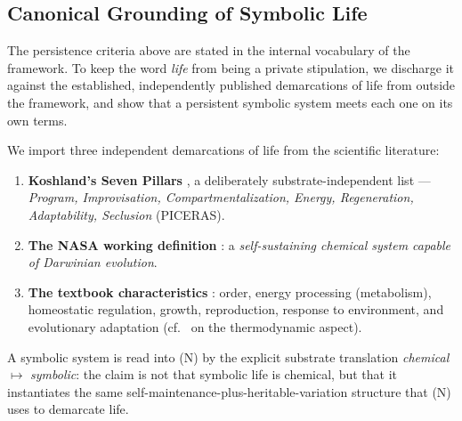 \subsection{Canonical Grounding of Symbolic Life}
\label{subsec:bk3_canonical_grounding_of_symbolic_life}
The persistence criteria above are stated in the internal vocabulary of the
framework. To keep the word \emph{life} from being a private stipulation, we
discharge it against the established, independently published demarcations of
life from outside the framework, and show that a persistent symbolic system
meets each one on its own terms.

\begin{definition}
\label{definition:bk3_canonical_life_standards}
We import three independent demarcations of life from the scientific literature:
\begin{enumerate}
    \item[\textbf{(K)}] \textbf{Koshland's Seven Pillars} \citep{koshland2002pillars},
    a deliberately substrate-independent list --- \emph{Program, Improvisation,
    Compartmentalization, Energy, Regeneration, Adaptability, Seclusion}
    (PICERAS).
    \item[\textbf{(N)}] \textbf{The NASA working definition} \citep{joyce1994foreword}:
    a \emph{self-sustaining chemical system capable of Darwinian evolution}.
    \item[\textbf{(T)}] \textbf{The textbook characteristics}
    \citep{urry2021campbell}: order, energy processing (metabolism), homeostatic
    regulation, growth, reproduction, response to environment, and evolutionary
    adaptation (cf.~\citealp{schrodinger1944life} on the thermodynamic
    aspect).
\end{enumerate}
A symbolic system is read into (N) by the explicit substrate translation
\emph{chemical} $\mapsto$ \emph{symbolic}: the claim is not that symbolic life is
chemical, but that it instantiates the same self-maintenance-plus-heritable-variation
structure that (N) uses to demarcate life.
\end{definition}

